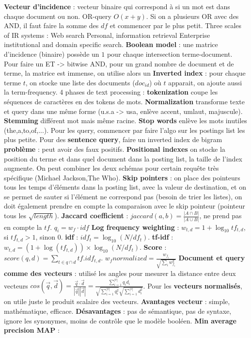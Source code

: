 \documentclass[9pt,a4paper]{report}
\begin{document}
\textbf{Vecteur d'incidence} : vecteur binaire qui correspond à si un mot est dans chaque document ou non. OR-query $O(x+y)$. Si on a plusieurs OR avec des AND, il faut faire la somme des $df$ et commencer par le plus petit. Three scales of IR systems : Web	search Personal, information retrieval Enterprise institutional and domain specific search. \textbf{Boolean model} : une matrice d'incidence (binaire) possède un $1$ pour chaque intersection terme-document. Pour faire un ET -> bitwise AND, pour un grand nombre de document et de terme, la matrice est immense, on utilise alors un \textbf{Inverted index} : pour chaque terme $t$, on stocke une liste des documents ($doc_{id}$) où $t$ apparait, on ajoute aussi la term-frequency. 4 phases de text processing : \textbf{tokenization} coupe les séquences de caractères en des tokens de mots. \textbf{Normalization} transforme texte et query dans une même forme (u.s.a -> usa, enlève accent, umlaut, majuscule). \textbf{Stemming} différent mot mais même racine. \textbf{Stop words} enlève les mots inutiles (the,a,to,of,...). Pour les query, commencer par faire l'algo sur les postings list les plus petite. Pour des \textbf{sentence query}, faire un inverted index de bigram \textbf{problème} : peut avoir des faux positifs. \textbf{Positional indexes} on stocke la position du terme et dans quel document dans la posting list, la taille de l'index augmente. On peut combiner les deux schémas pour certain requête très spécifique (Michael Jackson,The Who). \textbf{Skip pointers} : on place des pointeurs tous les temps d'éléments dans la posting list, avec la valeur de destination, et on se permet de sauter si l'élément ne correspond pas (besoin de trier les listes), on doit également prendre en compte la comparaison avec le skip pointeur (pointeur tous les $\sqrt{length}$). \textbf{Jaccard coefficient} : $jaccard(a,b)=\frac{|A \cap B|}{|A \cup B|}$, ne prend pas en compte la $tf$. $q_i=w_f\cdot idf$ \textbf{Log frequency weighting} : $w_{t,d}=1+\log_{10}tf_{t,d}$, si $tf_{t,d} > 1$, sinon $0$. \textbf{idf} : $idf_t=\log_{10}(N/df_t)$. \textbf{tf-idf} : $w_{t,d}=(1+\log(tf_{t,d}))\times \log_{10}(N/df_t)$. \textbf{Score} : $score(q,d)=\sum_{t\in q \cap d}tf.idf_{t,d}$. $w_f normalized = \frac{w_{f_i}}{\sqrt{\sum_{i}w_{f_i}^2}}$ \textbf{Document et query comme des vecteurs} : utilisé les angles pour mesurer la distance entre deux vecteurs $cos(\vec{q},\vec{d})=\frac{\vec{q}\cdot \vec{d}}{|\vec{q}||\vec{d}|} = \frac{\sum_{i=1}^{|v|}q_id_i}{\sqrt{\sum_{i=1}^{|v|}q_i^2}\sqrt{\sum_{i=1}^{|v|}d_i^2}}$. Pour les \textbf{vecteurs normalisés}, on utile juste le produit scalaire des vecteurs. \textbf{Avantages vecteur} : simple, mathématique, efficace. \textbf{Désavantages} : pas de sémantique, pas de syntaxe, ignore les synonymes, moins de contrôle que le modèle booléen. \textbf{Min average precision MAP} : 
\end{document}

